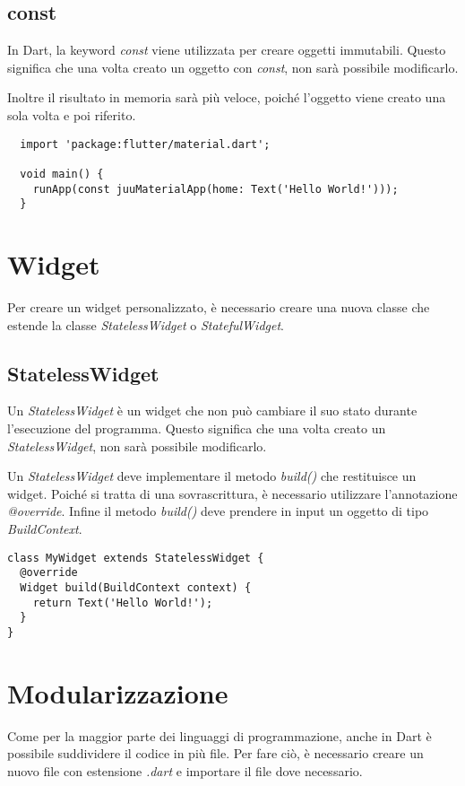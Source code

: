 \documentclass[12pt]{article}
\begin{document}
\subsection{const}
In Dart, la keyword \textit{const} viene utilizzata per creare
oggetti immutabili. Questo significa che una volta creato un oggetto con \textit{const}, non sarà possibile modificarlo.

Inoltre il risultato in memoria sarà più veloce, poiché l'oggetto
viene creato una sola volta e poi riferito.

\begin{verbatim}
  import 'package:flutter/material.dart';
  
  void main() {
    runApp(const juuMaterialApp(home: Text('Hello World!')));
  }
\end{verbatim}

\section{Widget}
Per creare un widget personalizzato, è necessario creare una nuova classe
che estende la classe \textit{StatelessWidget} o \textit{StatefulWidget}.

\subsection{StatelessWidget}
Un \textit{StatelessWidget} è un widget che non può cambiare il suo stato
durante l'esecuzione del programma. Questo significa che una volta creato
un \textit{StatelessWidget}, non sarà possibile modificarlo.

Un \textit{StatelessWidget} deve implementare il metodo \textit{build()} che
restituisce un widget. Poiché si tratta di 
una sovrascrittura, è necessario utilizzare l'annotazione \textit{@override}. Infine 
il metodo \textit{build()} deve prendere in input un oggetto di tipo \textit{BuildContext}.
\begin{verbatim}
class MyWidget extends StatelessWidget {
  @override
  Widget build(BuildContext context) {
    return Text('Hello World!');
  }
}
\end{verbatim}


\section{Modularizzazione}
Come per la maggior parte dei linguaggi di programmazione,
anche in Dart è possibile suddividere il codice in più file.
Per fare ciò, è necessario creare un nuovo file con estensione \textit{.dart}
e importare il file dove necessario.
\end{document}
